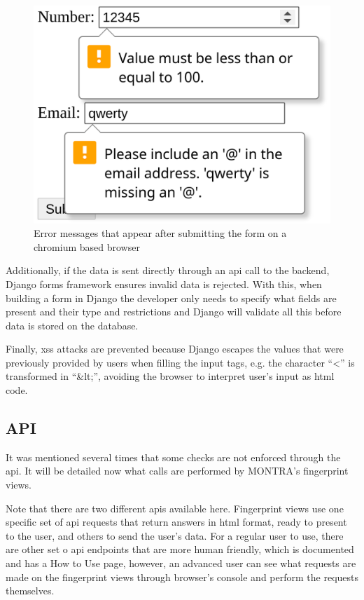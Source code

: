 \begin{figure}
    \center
    \includegraphics[width=.3\textwidth]{html-form-validation}
    \caption{Error messages that appear after submitting the form on a chromium based browser}
    \label{fig:html-form-validation}
\end{figure}

Additionally, if the data is sent directly through an \gls{api} call to the backend, Django forms framework ensures invalid data is rejected.
With this, when building a form in Django the developer only needs to specify what fields are present and their type and restrictions and Django will validate all this before data is stored on the database.

Finally, \gls{xss} attacks are prevented because Django escapes the values that were previously provided by users when filling the input tags, e.g. the character ``<'' is transformed in ``\&lt;'', avoiding the browser to interpret user's input as \gls{html} code.

\subsection*{API}


It was mentioned several times that some checks are not enforced through the \gls{api}.
It will be detailed now what calls are performed by MONTRA's fingerprint views.

Note that there are two different \gls{api}s available here.
Fingerprint views use one specific set of \gls{api} requests that return answers in \gls{html} format, ready to present to the user, and others to send the user's data.
For a regular user to use, there are other set o \gls{api} endpoints that are more human friendly, which is documented and has a How to Use page, however, an advanced user can see what requests are made on the fingerprint views through browser's console and perform the requests themselves.

